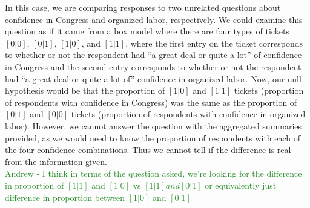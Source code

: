 \documentclass[11pt]{article}
\begin{document}
\noindent In this case, we are comparing responses to two unrelated questions about confidence in Congress and organized labor, respectively. We could examine this question as if it came from a box model where there are four types of tickets $ [0|0] $, $ [0|1] $, $ [1|0] $, and $ [1|1] $, where the first entry on the ticket corresponds to whether or not the respondent had ``a great deal or quite a lot'' of confidence in Congress and the second entry corresponds to whether or not the respondent had ``a great deal or quite a lot of'' confidence in organized labor. Now, our null hypothesis would be that the proportion of $[1|0]$ and $[1|1]$ tickets (proportion of respondents with confidence in Congress) was the same as the proportion of $[0|1]$ and $[0|0]$ tickets (proportion of respondents with confidence in organized labor). However, we cannot answer the question with the aggregated summaries provided, as we would need to know the proportion of respondents with each of the four confidence combinations. Thus we cannot tell if the difference is real from the information given.
%
\\

\textcolor{ForestGreen}{Andrew - I think in terms of the question asked, we're looking for the difference in proportion of $ [1|1] $ and $ [1|0] $ vs $ [1|1] and [0|1] $ or equivalently just difference in proportion between $ [1|0] $ and $ [0|1] $}
\end{document}
